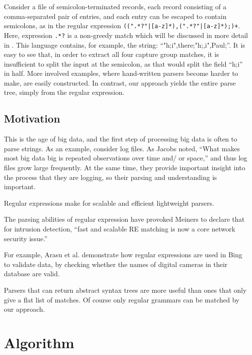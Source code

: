 \documentclass[english]{sigplanconf}
\theoremstyle{definition}
\begin{document}
Consider a file of semicolon-terminated records, each record consisting
of a comma-separated pair of entries, and each entry can be escaped
to contain semicolons, as in the regular expression
\texttt{((".*?"|[a-z]*),(".*?"|[a-z]*);)+}. Here, expression
\texttt{.*?} is a non-greedy match which will be discussed in more
detail in .  This language contains, for example, the
string: ``"h;i",there;"h;,i",Paul;''.  It is easy to see that, in
order to extract all four capture group matches, it is insufficient
to split the input at the semicolon, as that would split the field
``h;i'' in half.  More involved examples, where hand-written parsers
become harder to make, are easily constructed.  In contrast, our
approach yields the entire parse tree, simply from the regular
expression.



\subsection{Motivation}

This is the age of big data, and the first step of processing big
data is often to parse strings. As an example, consider log files.
As Jacobs\cite{Jaco09a}
noted, ``What makes most big data big is repeated observations over
time and/ or space,'' and thus log files grow large frequently. At
the same time, they provide important insight into the process that
they are logging, so their parsing and understanding is important. 

Regular expressions make for scalable and efficient lightweight parsers.\cite{Kart96a} 

The parsing abilities of regular expression have provoked Meiners to declare
that for intrusion detection, ``fast and scalable RE matching is
now a core network security issue.'' \cite{Mein10a}

For example, Arasu et al. \cite{Aras12a} demonstrate how regular
expressions are used in Bing to validate data, by checking whether
the names of digital cameras in their database are valid.

Parsers that can return abstract syntax trees are more useful than
ones that only give a flat list of matches. Of course only regular
grammars can be matched by our approach.

\section{Algorithm}
\end{document}
